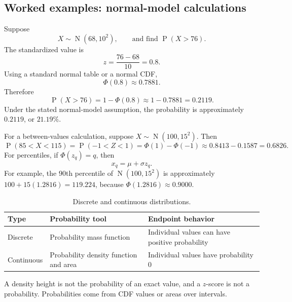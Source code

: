 \documentclass[11pt]{article}
\newcommand{\Pp}{\operatorname{P}}
\newcommand{\N}{\operatorname{N}}
\begin{document}
\subsection{Worked examples: normal-model calculations}
Suppose
\[
X\sim \N(68,10^2),\qquad \text{and find }\Pp(X>76).
\]
The standardized value is
\[
z=\frac{76-68}{10}=0.8.
\]
Using a standard normal table or a normal CDF,
\[
\Phi(0.8)\approx0.7881.
\]
Therefore
\[
\Pp(X>76)=1-\Phi(0.8)\approx1-0.7881=0.2119.
\]
Under the stated normal-model assumption, the probability is approximately
$0.2119$, or $21.19\%$.

For a between-values calculation, suppose $X\sim\N(100,15^2)$.  Then
\[
\Pp(85<X<115)=\Pp\left(-1<Z<1\right)
=\Phi(1)-\Phi(-1)\approx0.8413-0.1587=0.6826.
\]
For percentiles, if $\Phi(z_q)=q$, then
\[
x_q=\mu+\sigma z_q.
\]
For example, the $90$th percentile of $\N(100,15^2)$ is approximately
$100+15(1.2816)=119.224$, because $\Phi(1.2816)\approx0.9000$.

\begin{table}[ht]
\centering
\caption{Discrete and continuous distributions.}\label{tab:discrete-continuous}
\begin{tabularx}{\textwidth}{@{}lYY@{}}
\toprule
Type & Probability tool & Endpoint behavior \\
\midrule
Discrete & Probability mass function & Individual values can have positive probability \\
Continuous & Probability density function and area & Individual values have probability $0$ \\
\bottomrule
\end{tabularx}
\end{table}

\begin{keybox}
A density height is not the probability of an exact value, and a $z$-score is not
a probability.  Probabilities come from CDF values or areas over intervals.
\end{keybox}
\end{document}
